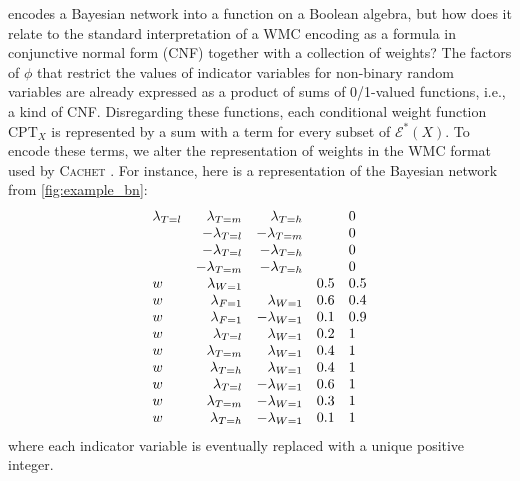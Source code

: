  encodes a Bayesian network into a function on a Boolean
algebra, but how does it relate to the standard interpretation of a WMC encoding
as a formula in conjunctive normal form (CNF) together with a collection of
weights? The factors of $\phi$ that restrict the values of indicator variables
for non-binary random variables are already expressed as a product of sums of
0/1-valued functions, i.e., a kind of CNF\@. Disregarding these functions, each
conditional weight function $\mathrm{CPT}_X$ is represented by a sum with a term
for every subset of $\mathcal{E}^*(X)$. To encode these terms, we alter the
representation of weights in the WMC format used by \textsc{Cachet}
\citep{DBLP:conf/sat/SangBBKP04}. For instance, here is a representation of the
Bayesian network from \cref{fig:example_bn}:
\[
  \begin{array}{lrrll}
    \lambda\sb{T=l} &\lambda\sb{T=m} &\lambda\sb{T=h} & &0 \\
                    &-\lambda\sb{T=l} &-\lambda\sb{T=m} & &0 \\
                    &-\lambda\sb{T=l} &-\lambda\sb{T=h} & &0 \\
                    &-\lambda\sb{T=m} &-\lambda\sb{T=h} & &0 \\
    w &\lambda\sb{W=1} & &0.5 &0.5 \\
    w &\lambda\sb{F=1} &\lambda\sb{W=1} &0.6 &0.4 \\
    w &\lambda\sb{F=1} &-\lambda\sb{W=1} &0.1 &0.9 \\
    w &\lambda\sb{T=l} &\lambda\sb{W=1} &0.2 &1 \\
    w &\lambda\sb{T=m} &\lambda\sb{W=1} &0.4 &1 \\
    w &\lambda\sb{T=h} &\lambda\sb{W=1} &0.4 &1 \\
    w &\lambda\sb{T=l} &-\lambda\sb{W=1} &0.6 &1 \\
    w &\lambda\sb{T=m} &-\lambda\sb{W=1} &0.3 &1 \\
    w &\lambda\sb{T=h} &-\lambda\sb{W=1} &0.1 &1
  \end{array}
\]
where each indicator variable is eventually replaced with a unique positive
integer.

